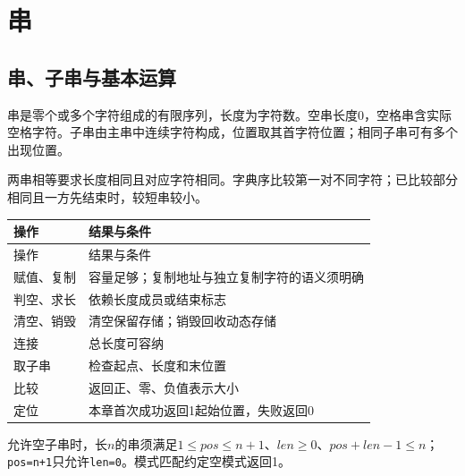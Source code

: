 \chapter{串}\label{DS04}

\section{串、子串与基本运算}\label{DS04-definition}

串是零个或多个字符组成的有限序列，长度为字符数。空串长度0，空格串含实际空格字符。子串由主串中连续字符构成，位置取其首字符位置；相同子串可有多个出现位置。

两串相等要求长度相同且对应字符相同。字典序比较第一对不同字符；已比较部分相同且一方先结束时，较短串较小。

\par\smallskip
{\fontsize{9.3}{12}\selectfont\setlength{\tabcolsep}{2.5pt}\setlength{\LTleft}{0pt}\setlength{\LTright}{0pt}
\begin{longtable}{@{}>{\raggedright\arraybackslash}p{}>{\raggedright\arraybackslash}p{}@{}}
\toprule
操作 & 结果与条件 \\

\midrule\endfirsthead\toprule
操作 & 结果与条件 \\

\midrule\endhead\bottomrule\endfoot
赋值、复制 & 容量足够；复制地址与独立复制字符的语义须明确 \\

判空、求长 & 依赖长度成员或结束标志 \\

清空、销毁 & 清空保留存储；销毁回收动态存储 \\

连接 & 总长度可容纳 \\

取子串 & 检查起点、长度和末位置 \\

比较 & 返回正、零、负值表示大小 \\

定位 & 本章首次成功返回1起始位置，失败返回0 \\

\end{longtable}}
\par\smallskip

允许空子串时，长\(n\)的串须满足\(1\le pos\le n+1\)、\(len\ge0\)、\(pos+len-1\le n\)；\texttt{pos=\allowbreak{}n+\allowbreak{}1}只允许\texttt{len=\allowbreak{}0}。模式匹配约定空模式返回1。

